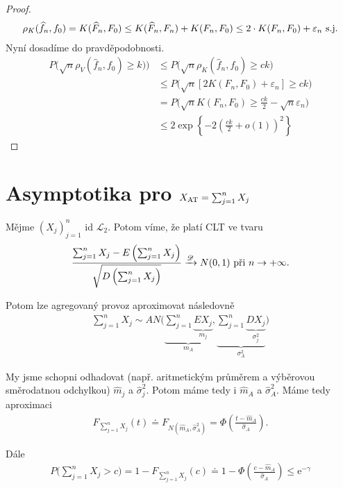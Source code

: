 \documentclass{article}
\theoremstyle{remark}
\theoremstyle{plain}
\theoremstyle{definition}
\theoremstyle{remark}
\begin{document}
\begin{enumerate}
\begin{proof}
    \begin{align*}
        \rho_K(\widehat{f}_n,f_0)=K(\widehat{F}_n,F_0)\leq K(\widehat{F}_n,F_n)+K(F_n,F_0)\leq 2\cdot K(F_n,F_0)+\varepsilon_n\,\,\textnormal{s.j.}
    \end{align*}
    Nyní dosadíme do pravděpodobnosti.
    \begin{align*}
        P\big(\sqrt{n}\rho_V(\widehat{f}_n,f_0)\geq k)\big)&\leq P\big(\sqrt{n}\rho_K(\widehat{f}_n,f_0)\geq ck\big) \\
        &\leq P\big(\sqrt{n}[2K(F_n,F_0)+\varepsilon_n]\geq ck\big) \\
        &=P\big(\sqrt{n}K(F_n,F_0)\geq \frac{ck}{2}-\sqrt{n}\varepsilon_n\big) \\
        &\leq 2\exp\left\{-2\left(\frac{ck}{2}+o(1)\right)^2\right\}
    \end{align*}
    \end{proof}
\end{enumerate} 

\section{Asymptotika pro $X_{\textnormal{AT}}=\sum_{j=1}^nX_j$}

Mějme $(X_j)_{j=1}^n$ id $\mathscr{L}_2$. Potom víme, že platí CLT ve tvaru
\begin{align*}
    \frac{\sum_{j=1}^n X_j-E\left(\sum_{j=1}^nX_j\right)}{\sqrt{D\left(\sum_{j=1}^nX_j\right)}}\xrightarrow{\mathscr{D}} N(0,1)\textnormal{ při } n\rightarrow +\infty.
\end{align*}

Potom lze agregovaný provoz aproximovat následovně
\begin{align*}
    \sum_{j=1}^nX_j\sim AN\bigg(\underbrace{\sum_{j=1}^n\underbrace{EX_j}_{m_j}}_{m_A},\underbrace{\sum_{j=1}^n\underbrace{DX_j}_{\sigma_j^2}}_{\sigma_A^2}\bigg)
\end{align*}

My jsme schopni odhadovat (např. aritmetickým průměrem a výběrovou směrodatnou odchylkou) $\widehat{m}_j$ a $\widehat{\sigma}^2_j$. Potom máme tedy i $\widehat{m}_A$ a $\widehat{\sigma}^2_A$. Máme tedy aproximaci
\begin{align*}
    F_{\sum_{j=1}^nX_{j}}(t)\doteq F_{N(\widehat{m}_{A},\widehat{\sigma}^2_{A})}=\varPhi\left(\frac{t-\widehat{m}_A}{\widehat{\sigma}_A}\right).
\end{align*}

Dále
\begin{align*}
    P\big(\sum_{j=1}^nX_j>c\big)=1- F_{\sum_{j=1}^nX_{j}}(c)\doteq 1-\varPhi\left(\frac{c-\widehat{m}_A}{\widehat{\sigma}_A}\right)\leq \mathrm{e}^{-\gamma}
\end{align*}
\end{document}

